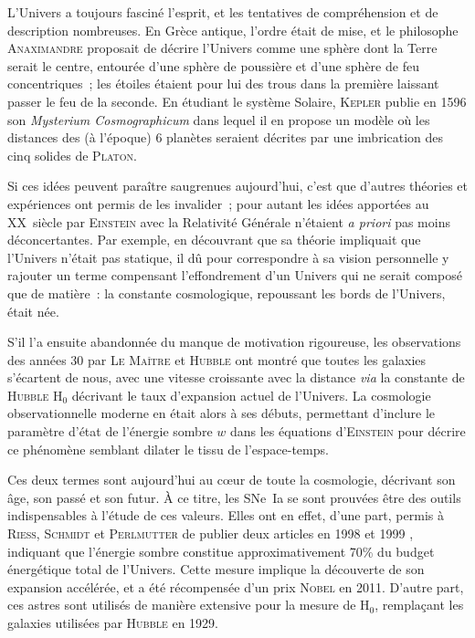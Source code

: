 \documentclass[../main/main.tex]{subfiles}
\begin{document}

L'Univers a toujours fasciné l'esprit, et les tentatives de compréhension et de
description nombreuses. En Grèce antique, l'ordre était de mise, et le
philosophe \textsc{Anaximandre} proposait de décrire l'Univers comme une sphère
dont la Terre serait le centre, entourée d'une sphère de poussière et d'une
sphère de feu concentriques~; les étoiles étaient pour lui des trous dans la
première laissant passer le feu de la seconde. En étudiant le système Solaire,
\textsc{Kepler} publie en 1596 son \textit{Mysterium Cosmographicum} dans lequel
il en propose un modèle où les distances des (à l'époque) 6 planètes seraient
décrites par une imbrication des cinq solides de \textsc{Platon}.

Si ces idées peuvent paraître saugrenues aujourd'hui, c'est que d'autres
théories et expériences ont permis de les invalider~; pour autant les idées
apportées au XX\ieme\ siècle par \textsc{Einstein} avec la Relativité Générale
\citep{einstein1915} n'étaient \textit{a priori} pas moins déconcertantes. Par
exemple, en découvrant que sa théorie impliquait que l'Univers n'était pas
statique, il dû pour correspondre à sa vision personnelle y rajouter un terme
compensant l'effondrement d'un Univers qui ne serait composé que de matière~: la
constante cosmologique, repoussant les bords de l'Univers, était née.

S'il l'a ensuite abandonnée du manque de motivation rigoureuse, les observations
des années 30 par \textsc{Le Maître} et \textsc{Hubble} \citep{hubble1929} ont
montré que toutes les galaxies s'écartent de nous, avec une vitesse croissante
avec la distance \textit{via} la constante de \textsc{Hubble} H$_0$ décrivant le
taux d'expansion actuel de l'Univers. La cosmologie observationnelle moderne en
était alors à ses débuts, permettant d'inclure le paramètre d'état de l'énergie
sombre $w$ dans les équations d'\textsc{Einstein} pour décrire ce phénomène
semblant dilater le tissu de l'espace-temps.

Ces deux termes sont aujourd'hui au cœur de toute la cosmologie, décrivant son
âge, son passé et son futur. À ce titre, les SNe~Ia se sont prouvées être des
outils indispensables à l'étude de ces valeurs. Elles ont en effet, d'une part,
permis à \textsc{Riess}, \textsc{Schmidt} et \textsc{Perlmutter} de publier deux
articles en 1998 et 1999 \citep{riess1998, perlmutter1999}, indiquant que
l'énergie sombre constitue approximativement 70\% du budget énergétique total de
l'Univers. Cette mesure implique la découverte de son expansion accélérée, et a
été récompensée d'un prix \textsc{Nobel} en 2011. D'autre part, ces astres sont
utilisés de manière extensive pour la mesure de H$_0$, remplaçant les galaxies
utilisées par \textsc{Hubble} en 1929.
\end{document}
